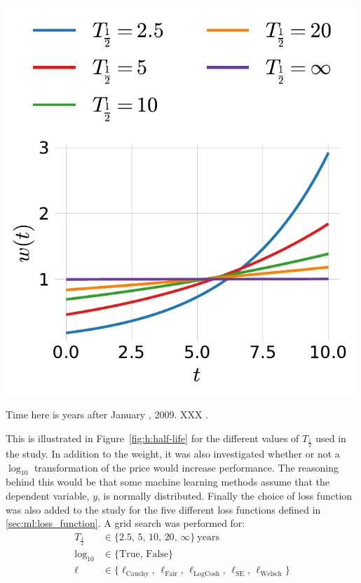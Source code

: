 \begin{marginfigure}
  \includegraphics[width=0.99\textwidth]{figures/housing/Villa_v18_cut_all_Ncols_all_half_life_weights.pdf}
  \caption[XXX ]
    {Time here is years after January , 2009. XXX \TODO. 
    }
  \label{fig:h:half-life}
\end{marginfigure}

This is illustrated in Figure~\ref{fig:h:half-life} for the different values of $T_{\frac{1}{2}}$ used in the study.  In addition to the weight, it was also investigated whether or not a $\log_{10}$ transformation of the price would increase performance. The reasoning behind this would be that some machine learning methods assume that the dependent variable, $y$, is normally distributed. Finally the choice of loss function was also added to the study for the five different loss functions defined in \autoref{sec:ml:loss_function}. A grid search was performed for:
\begin{equation}
  \begin{split}
    T_{\frac{1}{2}} &\in \{2.5,\, 5,\, 10,\, 20,\, \infty \}~\mathrm{ years} \\
    \log_{10} &\in \{\mathrm{True},\, \mathrm{False} \} \\
    \ell &\in \{ \ell_\mathrm{Cauchy},\, \ell_\mathrm{Fair},\, \ell_\mathrm{LogCosh},\, \ell_\mathrm{SE},\, \ell_\mathrm{Welsch}\}
  \end{split}
\end{equation}

